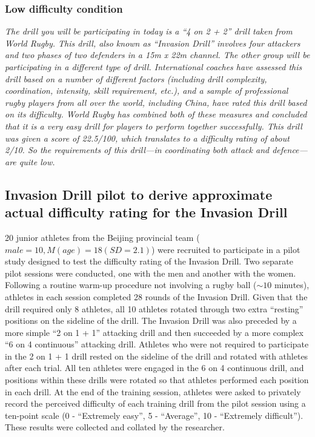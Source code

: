\begin{CJK}{UTF8}{gbsn}
\subsubsection{\label{app9:conditionPrimeLow}Low difficulty condition}
\textit{The drill you will be participating in today is a ``4 on 2 + 2'' drill taken from World Rugby.  This drill, also known as ``Invasion Drill'' involves four attackers and two phases of two defenders in a 15m x 22m channel.  The other group will be participating in a different type of drill.  International coaches have assessed this drill based on a number of different factors (including drill complexity, coordination, intensity, skill requirement, etc.), and a sample of professional rugby players from all over the world, including China, have rated this drill based on its difficulty.  World Rugby has combined both of these measures and concluded that it is a very easy drill for players to perform together successfully.  This drill was given a score of 22.5/100, which translates to a difficulty rating of about 2/10.  So the requirements of this drill—in coordinating both attack and defence—are quite low.}


\subsection{Invasion Drill pilot to derive approximate actual difficulty rating for the Invasion Drill\label{app9:difficultyPilot}}
20 junior athletes from the Beijing provincial team ($male = 10,  M(age) = 18 (SD = 2.1)$) were recruited to participate in a pilot study designed to test the difficulty rating of the Invasion Drill.  Two separate pilot sessions were conducted, one with the men and another with the women.  Following a routine warm-up procedure not involving a rugby ball ($\sim10$ minutes), athletes in each session completed 28 rounds of the Invasion Drill.  Given that the drill required only 8 athletes, all 10 athletes rotated through two extra ``resting'' positions on the sideline of the drill.  The Invasion Drill was also preceded by a more simple ``2 on 1 + 1'' attacking drill and then succeeded by a more complex ``6 on 4 continuous'' attacking drill.  Athletes who were not required to participate in the 2 on 1 + 1 drill rested on the sideline of the drill and rotated with athletes after each trial.  All ten athletes were engaged in the 6 on 4 continuous drill, and positions within these drills were rotated so that athletes performed each position in each drill.  At the end of the training session, athletes were asked to privately record the perceived difficulty of each training drill from the pilot session using a ten-point scale (0 - ``Extremely easy'', 5 - ``Average'', 10 - ``Extremely difficult''). These results were collected and collated by the researcher.


\end{CJK}

